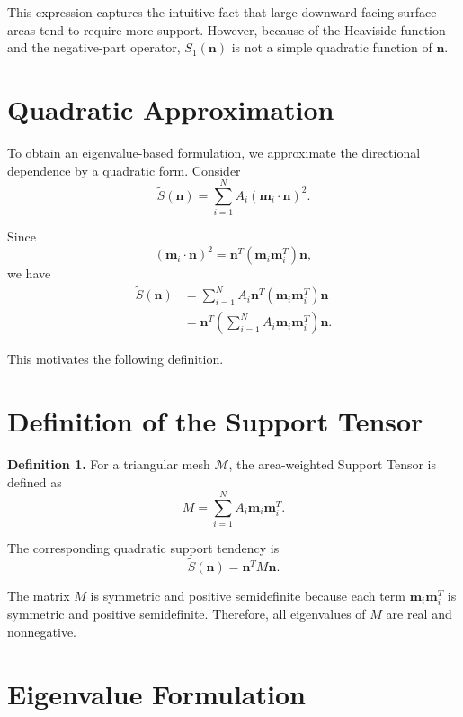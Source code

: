 \documentclass[11pt,a4paper]{article}
\begin{document}
This expression captures the intuitive fact that large downward-facing surface areas tend to require more support.
However, because of the Heaviside function and the negative-part operator, $S_1(\bm n)$ is not a simple quadratic function of $\bm n$.

\section{Quadratic Approximation}

To obtain an eigenvalue-based formulation, we approximate the directional dependence by a quadratic form.
Consider
\begin{equation}
\widetilde S(\bm n)
=
\sum_{i=1}^{N}
A_i
(\bm m_i\cdot \bm n)^2.
\label{eq:quadratic_support}
\end{equation}

Since
\[
(\bm m_i\cdot \bm n)^2
=
\bm n^T
(\bm m_i\bm m_i^T)
\bm n,
\]
we have
\begin{align}
\widetilde S(\bm n)
&=
\sum_{i=1}^{N}
A_i
\bm n^T
(\bm m_i\bm m_i^T)
\bm n\\
&=
\bm n^T
\left(
\sum_{i=1}^{N}
A_i
\bm m_i\bm m_i^T
\right)
\bm n.
\end{align}

This motivates the following definition.

\section{Definition of the Support Tensor}

\textbf{Definition 1.}
For a triangular mesh $\mathcal M$, the area-weighted Support Tensor is defined as
\begin{equation}
M
=
\sum_{i=1}^{N}
A_i
\bm m_i\bm m_i^T.
\label{eq:support_tensor}
\end{equation}

The corresponding quadratic support tendency is
\begin{equation}
\widetilde S(\bm n)
=
\bm n^T M \bm n.
\label{eq:support_quadratic_form}
\end{equation}

The matrix $M$ is symmetric and positive semidefinite because each term
$\bm m_i\bm m_i^T$ is symmetric and positive semidefinite.
Therefore, all eigenvalues of $M$ are real and nonnegative.

\section{Eigenvalue Formulation}
\end{document}
